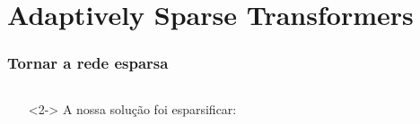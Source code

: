 \documentclass[xetex,aspectratio=169,xcolor,professionalfonts,hyperref]{beamer}
\begin{document}
\section{Adaptively Sparse Transformers}

\begin{frame}
    \frametitle{Tornar a rede esparsa}
    \fontsize{12pt}{15}\selectfont
    \begin{columns}
        \begin{column}{0.6\columnwidth}
            \begin{itemize}
            \end{itemize}

            \bigskip

            \begin{itemize}
                \item[]<2-> A nossa solução foi {\color{tPeony} esparsificar}:
            \end{itemize}

            \begin{quote}
                {\normalfont
                    \begin{itemize}
                    \end{itemize}}
            \end{quote}
        \end{column}

        \begin{column}{0.39\columnwidth}


\end{column}
\end{columns}
\end{frame}
\end{document}
